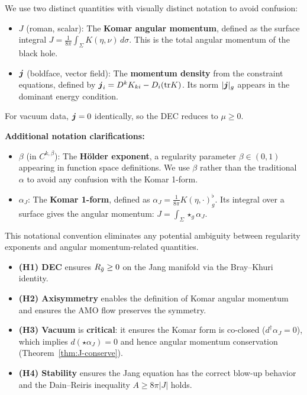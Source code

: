 \begin{remark}\label{rem:notation}
We use two distinct quantities with visually distinct notation to avoid confusion:
\begin{itemize}
    \item $J$ (roman, scalar): The \textbf{Komar angular momentum}, defined as the surface integral $J = \frac{1}{8\pi}\int_\Sigma K(\eta, \nu)\,d\sigma$. This is the total angular momentum of the black hole.
    \item $\boldsymbol{j}$ (boldface, vector field): The \textbf{momentum density} from the constraint equations, defined by $\boldsymbol{j}_i = D^k K_{ki} - D_i(\mathrm{tr} K)$. Its norm $|\boldsymbol{j}|_g$ appears in the dominant energy condition.
\end{itemize}
For vacuum data, $\boldsymbol{j} = 0$ identically, so the DEC reduces to $\mu \geq 0$.

\textbf{Additional notation clarifications:}
\begin{itemize}
    \item $\beta$ (in $C^{k,\beta}$): The \textbf{H\"older exponent}, a regularity parameter $\beta \in (0,1)$ appearing in function space definitions. We use $\beta$ rather than the traditional $\alpha$ to avoid any confusion with the Komar 1-form.
    \item $\alpha_J$: The \textbf{Komar 1-form}, defined as $\alpha_J = \frac{1}{8\pi}K(\eta, \cdot)^\flat_g$. Its integral over a surface gives the angular momentum: $J = \int_\Sigma \star_g \alpha_J$.
\end{itemize}
This notational convention eliminates any potential ambiguity between regularity exponents and angular momentum-related quantities.
\end{remark}

\begin{remark}\leavevmode
\begin{itemize}
    \item \textbf{(H1) DEC} ensures $R_{\bar{g}} \geq 0$ on the Jang manifold via the Bray--Khuri identity.
    \item \textbf{(H2) Axisymmetry} enables the definition of Komar angular momentum and ensures the AMO flow preserves the symmetry.
    \item \textbf{(H3) Vacuum} is \textbf{critical}: it ensures the Komar form is co-closed ($d^\dagger\alpha_J = 0$), which implies $d(\star\alpha_J) = 0$ and hence angular momentum conservation (Theorem~\ref{thm:J-conserve}).
    \item \textbf{(H4) Stability} ensures the Jang equation has the correct blow-up behavior and the Dain--Reiris inequality $A \geq 8\pi|J|$ holds.
\end{itemize}
\end{remark}

